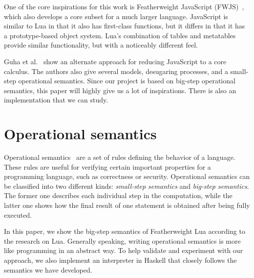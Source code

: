 One of the core inspirations for this work is Featherweight JavaScript (FWJS)~\cite{FWJS},
which also develops a core subset for a much larger language.
JavaScript is similar to Lua in that it also has first-class functions,
but it differs in that it has a prototype-based object system.
Lua's combination of tables and metatables provide similar functionality,
but with a noticeably different feel.

Guha et al.~\cite{EOJS} show an alternate approach for reducing JavaScript to a core calculus. The authors also give several models, desugaring processes, and a small-step operational semantics. Since our project is based on big-step operational semantics, this paper will highly give us a lot of inspirations. There is also an implementation that we can study.

\section{Operational semantics}
Operational semantics~\cite{AIOS} are a set of rules defining the behavior of a language.
These rules are useful for verifying certain important properties for a programming language, such as correctness or security.
Operational semantics can be classified into two different kinds: \emph{small-step semantics} and \emph{big-step semantics}. The former one describes each individual step in the computation, while the latter one shows how the final result of one statement is obtained after being fully executed.

In this paper, we show the big-step semantics of Featherweight Lua according to the research on Lua. Generally speaking, writing operational semantics is more like programming in an abstract way. To help validate and experiment with our approach, we also implement an interpreter in Haskell that closely follows the semantics we have developed.




